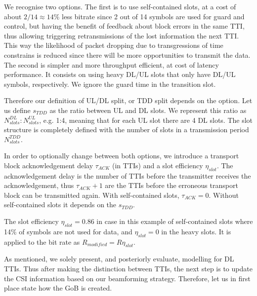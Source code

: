 We recognise two options. The first is to use self-contained slots, at a cost of about $2/14 \approx 14\%$ less bitrate since 2 out of 14 symbols are used for guard and control, but having the benefit of feedback about block errors in the same TTI, thus allowing triggering retransmissions of the lost information the next TTI. This way the likelihood of packet dropping due to transgressions of time constrains is reduced since there will be more opportunities to transmit the data. The second is simpler and more throughput efficient, at cost of latency performance. It consists on using heavy \ac{DL}/\ac{UL} slots that only have \ac{DL}/\ac{UL} symbols, respectively. We ignore the guard time in the transition slot.

Therefore our definition of \ac{UL}/\ac{DL} split, or \ac{TDD} split depends on the option. Let us define $s_{TDD}$ as the ratio between UL and DL slots. We represent this ratio as $N^{DL}_{slots} : N^{UL}_{slots}$, e.g. 1:4, meaning that for each UL slot there are 4 DL slots. The slot structure is completely defined with the number of slots in a transmission period $N^{TDD}_{slots}$.

In order to optionally change between both options, we introduce a transport block acknowledgement delay $\tau_{ACK}$ (in TTIs)  and a slot efficiency $\eta_{slot}$. The acknowledgement delay is the number of TTIs before the transmitter receives the acknowledgement, thus $\tau_{ACK} + 1$ are the TTIs before the erroneous transport block can be transmitted again. With self-contained slots, $\tau_{ACK} = 0$. Without self-contained slots it depends on the $s_{TDD}$.

The slot efficiency $\eta_{slot} = 0.86$ in case in this example of self-contained slots where 14\% of symbols are not used for data, and $\eta_{slot} = 0$ in the heavy slots. It is applied to the bit rate as $R_{modified} = R \eta_{slot}$.

\begin{comment}
Equations \eqref{eq:tdd_split} and \eqref{eq:slot_per}.

\begin{align}
    s_\text{TDD} &= N^\text{DL}_\text{slots} \ / \ N^\text{UL}_\text{slots} \label{eq:tdd_split} \\
    P_\text{slot} &= N^\text{DL}_\text{slots} + N^\text{UL}_\text{slots} \label{eq:slot_per}
\end{align}
\end{comment}

As mentioned, we solely present, and posteriorly evaluate, modelling for DL TTIs. Thus after making the distinction between TTIs, the next step is to update the CSI information based on our beamforming strategy. Therefore, let us in first place state how the \ac{GoB} is created.

